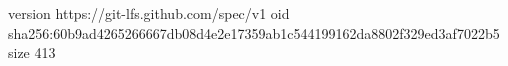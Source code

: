 version https://git-lfs.github.com/spec/v1
oid sha256:60b9ad4265266667db08d4e2e17359ab1c544199162da8802f329ed3af7022b5
size 413
